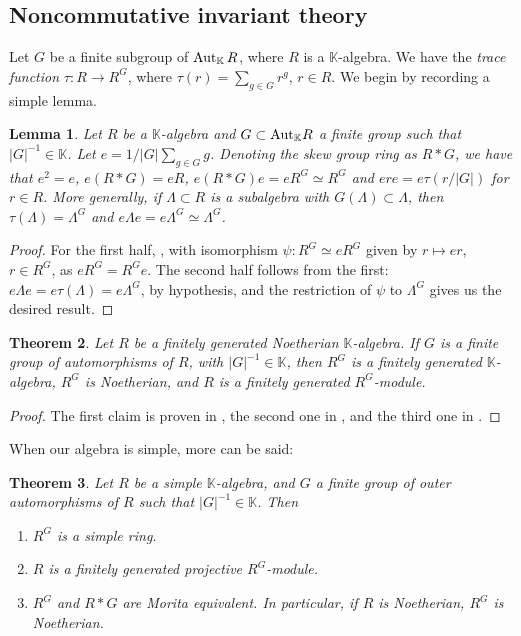 \documentclass[12pt, a4paper]{amsart}
\newtheorem{theorem}{Theorem}[section]
\newtheorem{lemma}[theorem]{Lemma}
\def\k{\mathbb K}
\newcommand{\Autk}{{\rm{Aut}}}
\def\k{\mathbb K}
\def\KK{\mathbb K}
\begin{document}
\subsection{Noncommutative invariant theory}
Let $G$ be a finite subgroup of $\Autk_\KK \, R$, where $R$ is a $\KK$-algebra. We have the \emph{trace function} $\tau:R\rightarrow R^G$, where $\tau(r)=\sum_{g \in G} r^g, \, r \in R$.
We begin by recording a simple lemma.
\begin{lemma}\label{most-basic-lemma}
Let $R$ be a $\KK$-algebra and $G \subset \Autk_\KK R$ a finite group such that $|G|^{-1} \in \KK$. Let $e=1 /|G| \sum_{g \in G} g$. Denoting the skew group ring as $R*G$, we have that $e^2=e$, $e(R*G)=eR$, $e(R*G)e=eR^G\simeq R^G$ and $ere=e\tau(r/|G|)$ for $r \in R$. More generally, if $\Lambda \subset R$ is a subalgebra with $G(\Lambda) \subset \Lambda$, then $\tau(\Lambda)=\Lambda^G$ and $e \Lambda e=e \Lambda^G \simeq \Lambda^G$.
\end{lemma}
\begin{proof}
    For the first half, \cite[Lemma 2.1 and its proof]{Montgomery}, with isomorphism $\psi: R^G \simeq eR^G$ given by $ r \mapsto er$, $ r \in R^G$, as $eR^G=R^Ge$. The second half follows from the first: $e \Lambda e= e \tau(\Lambda)= e \Lambda^G$, by hypothesis, and the restriction of $\psi$ to $ \Lambda^G$ gives us the desired result.
\end{proof}
\begin{theorem}\label{MS}
Let $R$ be a finitely generated Noetherian $\k$-algebra. If $G$ is a finite group of automorphisms of $R$, with $|G|^{-1} \in \k$, then $R^G$ is a finitely generated $\k$-algebra, $R^G$ is Noetherian, and $R$ is a finitely generated $R^G$-module.
\end{theorem}
\begin{proof}
    The first claim is proven in \cite{MS}, the second one in \cite[Corollary 1.12]{Montgomery}, and the third one in \cite[Corollary 5.9]{Montgomery}.
\end{proof}
When our algebra is simple, more can be said:
\begin{theorem}\label{essential-invariant}
    Let $R$ be a simple $\k$-algebra, and $G$ a finite group of outer automorphisms of $R$ such that $|G|^{-1} \in \k$. Then
    \begin{enumerate}
        \item $R^G$ is a simple ring.
        \item $R$ is a finitely generated projective $R^G$-module.
        \item $R^G$ and $R*G$ are Morita equivalent. In particular, if $R$ is Noetherian, $R^G$ is Noetherian.
    \end{enumerate}
\end{theorem}
\end{document}

